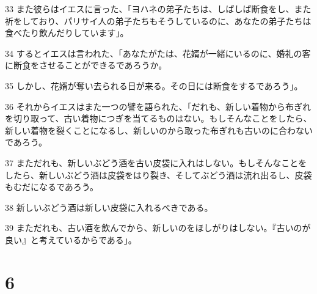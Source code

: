 \par 33 また彼らはイエスに言った、「ヨハネの弟子たちは、しばしば断食をし、また祈をしており、パリサイ人の弟子たちもそうしているのに、あなたの弟子たちは食べたり飲んだりしています」。
\par 34 するとイエスは言われた、「あなたがたは、花婿が一緒にいるのに、婚礼の客に断食をさせることができるであろうか。
\par 35 しかし、花婿が奪い去られる日が来る。その日には断食をするであろう」。
\par 36 それからイエスはまた一つの譬を語られた、「だれも、新しい着物から布ぎれを切り取って、古い着物につぎを当てるものはない。もしそんなことをしたら、新しい着物を裂くことになるし、新しいのから取った布ぎれも古いのに合わないであろう。
\par 37 まただれも、新しいぶどう酒を古い皮袋に入れはしない。もしそんなことをしたら、新しいぶどう酒は皮袋をはり裂き、そしてぶどう酒は流れ出るし、皮袋もむだになるであろう。
\par 38 新しいぶどう酒は新しい皮袋に入れるべきである。
\par 39 まただれも、古い酒を飲んでから、新しいのをほしがりはしない。『古いのが良い』と考えているからである」。

\chapter{6}

